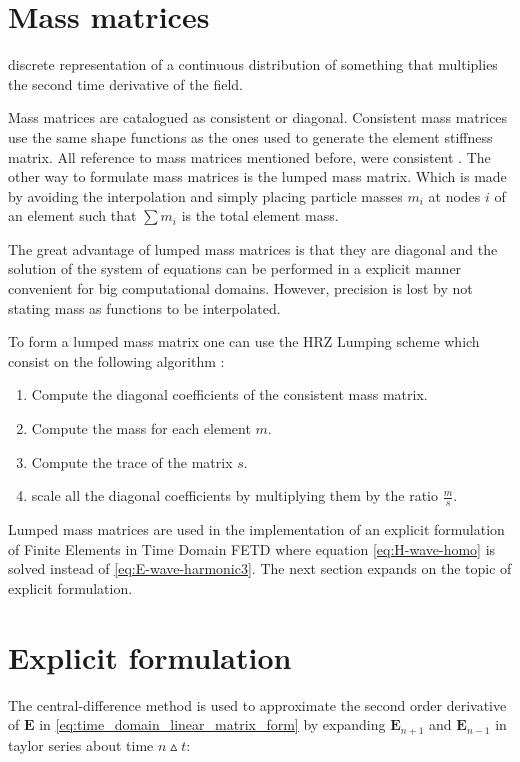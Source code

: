 \section{Mass matrices}
\label{sec:explicit_formulation}
discrete representation of a continuous distribution of something that multiplies the second time derivative of the field.

Mass matrices are catalogued as consistent or diagonal. Consistent mass matrices use the same shape functions as the ones used to generate the element stiffness matrix. All reference to mass matrices mentioned before, were consistent \cite{RobertD.Cook1989}. 
The other way to formulate mass matrices is the lumped mass matrix. Which is made by avoiding the interpolation and simply placing particle masses $m_i$ at nodes $i$ of an element such that $\sum m_i$ is the total element mass. 

The great advantage of lumped mass matrices is that they are diagonal and the solution of the system of equations can be performed in a explicit manner convenient for big computational domains.
However, precision is lost by not stating mass as functions to be interpolated. 

To form a lumped mass matrix one can use the HRZ Lumping scheme 
which consist on the following algorithm \cite{RobertD.Cook1989}:

\begin{enumerate}
\item Compute the diagonal coefficients of the consistent mass matrix.
\item Compute the mass for each element $m$.
\item Compute the trace of the matrix $s$.
\item scale all the diagonal coefficients by multiplying them by the ratio $\frac{m}{s}$.
\end{enumerate}
Lumped mass matrices are used in the implementation of an explicit formulation of Finite Elements in Time Domain FETD where equation \ref{eq:H-wave-homo} is solved instead of \ref{eq:E-wave-harmonic3}. The next section expands on the topic of explicit formulation.

\section{Explicit formulation}

The central-difference method is used to approximate the second order derivative of $\mathbf{E}$ in \ref{eq:time_domain_linear_matrix_form} by expanding $\mathbf{E}_{n+1}$ and $\mathbf{E}_{n-1}$  in taylor series about time $n \vartriangle t$:

